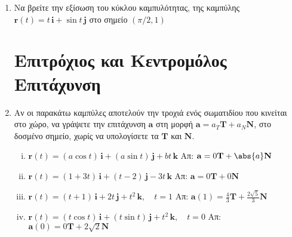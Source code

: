 \documentclass[a4paper,table]{report}
\begin{document}
\begin{enumerate}
    \enlargethispage{2\baselineskip}

  \item Να βρείτε την εξίσωση του κύκλου καμπυλότητας, της καμπύλης $
    \mathbf{r}(t)= t\, \mathbf{i} + \sin{t}\, \mathbf{j} $ στο σημείο $ (\pi /2,1) $

    \section*{Επιτρόχιος και Κεντρομόλος Επιτάχυνση}
    
   \item Αν οι παρακάτω καμπύλες αποτελούν την τροχιά ενός σωματιδίου που κινείται 
     στο χώρο, να γράψετε την επιτάχυνση $ \mathbf{a} $ στη μορφή $ \mathbf{a}= a_{T}
     \mathbf{T} + a_{N} \mathbf{N} $, στο δοσμένο σημείο, χωρίς να υπολογίσετε τα 
     $ \mathbf{T} $ και $ \mathbf{N} $.
     \begin{enumerate}[i)]
       \item $ \mathbf{r}(t)=(a \cos{t})\, \mathbf{i} + (a \sin{t})\, \mathbf{j} + bt \, 
         \mathbf{k} $ 
     \hfill Απ: $ \mathbf{a}= 0 \mathbf{T} + \abs{a} \mathbf{N} $ 

   \item $ \mathbf{r}(t)=(1+3t)\, \mathbf{i} + (t-2)\, \mathbf{j} - 3t\, \mathbf{k} $
     \hfill Απ: $ \mathbf{a}=0 \mathbf{T}+0 \mathbf{N} $  

   \item $ \mathbf{r}(t)=(t+1)\, \mathbf{i} + 2t\, \mathbf{j} + t^{2} \, \mathbf{k},
     \quad t=1 $ 
     \hfill Απ: $ \mathbf{a}(1)= \frac{4}{3} \mathbf{T}+ \frac{2 \sqrt{5}}{3} 
     \mathbf{N} $ 

   \item $ \mathbf{r}(t)=(t \cos{t})\, \mathbf{i} + (t \sin{t})\, \mathbf{j} + t^{2} \,
     \mathbf{k}, \quad t=0 $ 
     \hfill Απ: $ \mathbf{a}(0)=0 \mathbf{T}+2 \sqrt{2} \mathbf{N} $ 
     \end{enumerate}
\end{enumerate}
\end{document}
